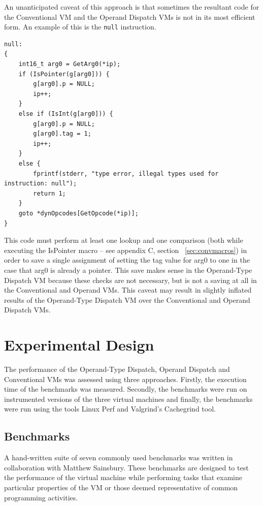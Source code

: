 \documentclass[english,a4paper,12pt]{report}
\begin{document}
An unanticipated caveat of this approach is that sometimes the
resultant code for the Conventional VM and the Operand Dispatch VMs is
not in its most efficient form. An example of this is the \verb|null|
instruction.

\begin{lstlisting}
null:
{
    int16_t arg0 = GetArg0(*ip);
    if (IsPointer(g[arg0])) {
        g[arg0].p = NULL;
        ip++;
    }
    else if (IsInt(g[arg0])) {
        g[arg0].p = NULL;
        g[arg0].tag = 1;
        ip++;
    }
    else {
        fprintf(stderr, "type error, illegal types used for instruction: null");
        return 1;
    }
    goto *dynOpcodes[GetOpcode(*ip)];
}
\end{lstlisting}

This code must perform at least one lookup and one comparison (both
while executing the IsPointer macro -- see appendix C, section ~\ref{sec:convmacros}) in
order to save a single assignment of setting the tag value for arg0 to
one in the case that arg0 is already a pointer. This save makes sense
in the Operand-Type Dispatch VM because these checks are not
necessary, but is not a saving at all in the Conventional and Operand
VMs. This caveat may result in slightly inflated results of the
Operand-Type Dispatch VM over the Conventional and Operand Dispatch
VMs.

\chapter{Experimental Design}

The performance of the Operand-Type Dispatch, Operand Dispatch and
Conventional VMs was assessed using three approaches. Firstly, the
execution time of the benchmarks was measured. Secondly, the
benchmarks were run on instrumented versions of the three virtual
machines and finally, the benchmarks were run using the tools Linux
Perf and Valgrind's Cachegrind \cite{cachegrind} tool.

\section{Benchmarks}

A hand-written suite of seven commonly used benchmarks was written in
collaboration with Matthew Sainsbury. These benchmarks are designed to
test the performance of the virtual machine while performing tasks
that examine particular properties of the VM or those deemed
representative of common programming activities.
\end{document}
